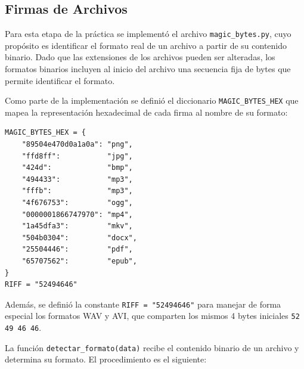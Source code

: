 \documentclass[12pt, a4paper]{article}
\begin{document}
\subsection{Firmas de Archivos}

Para esta etapa de la práctica se implementó el archivo \texttt{magic\_bytes.py},
cuyo propósito es identificar el formato real de un archivo a partir de su
contenido binario. Dado que las extensiones de los archivos pueden ser alteradas, 
los formatos binarios incluyen al inicio del archivo una secuencia fija de bytes 
que permite identificar el formato.

Como parte de la implementación se definió el diccionario \texttt{MAGIC\_BYTES\_HEX} 
que mapea la representación hexadecimal de cada firma al nombre de su formato:

\begin{verbatim}
MAGIC_BYTES_HEX = {
    "89504e470d0a1a0a": "png",
    "ffd8ff":           "jpg",
    "424d":             "bmp",
    "494433":           "mp3",
    "fffb":             "mp3",
    "4f676753":         "ogg",
    "0000001866747970": "mp4",
    "1a45dfa3":         "mkv",
    "504b0304":         "docx",
    "25504446":         "pdf",
    "65707562":         "epub",
}
RIFF = "52494646"
\end{verbatim}

Además, se definió la constante \texttt{RIFF = "52494646"} para manejar
de forma especial los formatos WAV y AVI, que comparten los mismos 4 bytes
iniciales \texttt{52 49 46 46}.

La función \texttt{detectar\_formato(data)} recibe el contenido binario de un
archivo y determina su formato. El procedimiento es el siguiente:
\end{document}
